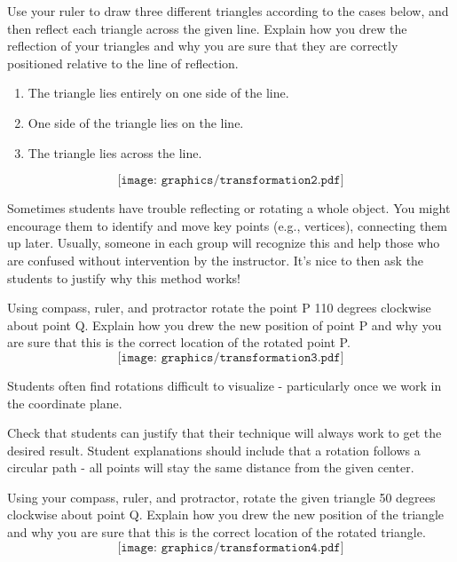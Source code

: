 \documentclass[handout]{ximera}
\begin{document}
\newpage
\begin{problem}
Use your ruler to draw three different triangles according to the cases below, and then reflect each triangle across the given line. Explain how you drew the reflection of your triangles and why you are sure that they are correctly positioned relative to the line of reflection.\\
\begin{enumerate}
    \item The triangle lies entirely on one side of the line.
    \item One side of the triangle lies on the line.
    \item The triangle lies across the line.
\end{enumerate}
\vskip 1in
\[
\texttt{[image: graphics/transformation2.pdf]}
\]
\vfill
\begin{instructorNotes}
Sometimes students have trouble reflecting or rotating a whole object.  You might encourage them to identify and move key points (e.g., vertices), connecting them up later.  Usually, someone in each group will recognize this and help those who are confused without intervention by the instructor.  It's nice to then ask the students to justify why this method works!
\end{instructorNotes}

\end{problem}
\newpage
\begin{problem}
Using compass, ruler, and protractor rotate the point P 110 degrees clockwise about point Q.  Explain how you drew the new position of point P and why you are sure that this is the correct location of the rotated point P.\\
\vskip 2in
\[
\texttt{[image: graphics/transformation3.pdf]}
\]

\begin{instructorNotes}
Students often find rotations difficult to visualize - particularly once we work in the coordinate plane.

Check that students can justify that their technique will always work to get the desired result.   Student explanations should include that a rotation follows a circular path - all points will stay the same distance from the given center.
\end{instructorNotes}
\vfill
\end{problem}
\newpage

\begin{problem}
Using your compass, ruler, and protractor, rotate the given triangle 50 degrees clockwise about point Q.  Explain how you drew the new position of the triangle and why you are sure that this is the correct location of the rotated triangle.\\


\[
\texttt{[image: graphics/transformation4.pdf]}
\]
\vfill
\end{problem}
\newpage
\end{document}
